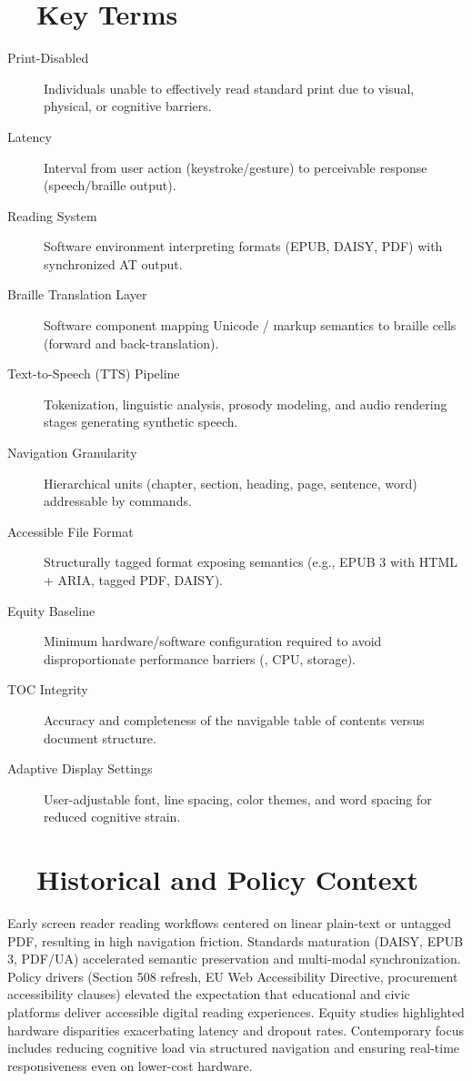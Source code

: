 \section{~~Key Terms}
\label{sec:sr27-key-terms}
\begin{description}
	\item[Print-Disabled] Individuals unable to effectively read standard print due to visual, physical, or cognitive barriers.
	\item[Latency] Interval from user action (keystroke/gesture) to perceivable response (speech/braille output).
	\item[Reading System] Software environment interpreting formats (EPUB, DAISY, PDF) with synchronized AT output.
	\item[Braille Translation Layer] Software component mapping Unicode / markup semantics to braille cells (forward and back-translation).
	\item[Text-to-Speech (TTS) Pipeline] Tokenization, linguistic analysis, prosody modeling, and audio rendering stages generating synthetic speech.
	\item[Navigation Granularity] Hierarchical units (chapter, section, heading, page, sentence, word) addressable by commands.
	\item[Accessible File Format] Structurally tagged format exposing semantics (e.g., EPUB 3 with HTML + ARIA, tagged PDF, DAISY).
	\item[Equity Baseline] Minimum hardware/software configuration required to avoid disproportionate performance barriers (, CPU, storage).
	\item[TOC Integrity] Accuracy and completeness of the navigable table of contents versus document structure.
	\item[Adaptive Display Settings] User-adjustable font, line spacing, color themes, and word spacing for reduced cognitive strain.
\end{description}

\section{~~Historical and Policy Context}
\label{sec:sr27-history}
Early screen reader reading workflows centered on linear plain-text or untagged PDF, resulting in high navigation friction. Standards maturation (DAISY, EPUB 3, PDF/UA) accelerated semantic preservation and multi-modal synchronization. Policy drivers (Section 508 refresh, EU Web Accessibility Directive, procurement accessibility clauses) elevated the expectation that educational and civic platforms deliver accessible digital reading experiences. Equity studies highlighted hardware disparities exacerbating latency and dropout rates\supercite{DiMaggio2001FromUnequalAccess, EquityViolationData}. Contemporary focus includes reducing cognitive load via structured navigation and ensuring real-time responsiveness even on lower-cost hardware.

